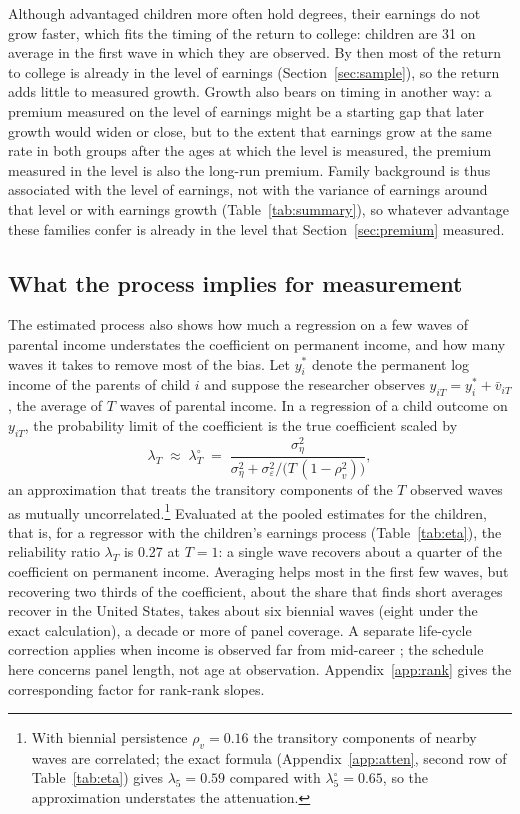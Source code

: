 \documentclass[11pt]{article}
\begin{document}
Although advantaged children more often hold degrees, their earnings do not grow faster, which fits the timing of the return to college: children are 31 on average in the first wave in which they are observed. By then most of the return to college is already in the level of earnings (Section~\ref{sec:sample}), so the return adds little to measured growth. Growth also bears on timing in another way: a premium measured on the level of earnings might be a starting gap that later growth would widen or close, but to the extent that earnings grow at the same rate in both groups after the ages at which the level is measured, the premium measured in the level is also the long-run premium. Family background is thus associated with the level of earnings, not with the variance of earnings around that level or with earnings growth (Table~\ref{tab:summary}), so whatever advantage these families confer is already in the level that Section~\ref{sec:premium} measured.

\subsection{What the process implies for measurement}
\label{sec:measurement}

The estimated process also shows how much a regression on a few waves of parental income understates the coefficient on permanent income, and how many waves it takes to remove most of the bias. Let $y^*_i$ denote the permanent log income of the parents of child $i$
and suppose the researcher
observes $y_{iT} = y^*_i + \bar v_{iT}$, the average of $T$ waves of parental income. In a regression of a child
outcome on $y_{iT}$, the probability limit of the coefficient is the
true coefficient scaled by
\begin{equation}
\lambda_T \;\approx\; \lambda^\circ_T \;=\; \frac{\sigma^2_\eta}
{\sigma^2_\eta + \sigma^2_\varepsilon / \big(T\,(1-\rho_v^2)\big)},
\label{eq:eta}
\end{equation}
an approximation that treats the transitory components of the $T$ observed waves as mutually uncorrelated.\footnote{With biennial persistence $\rho_v = 0.16$ the transitory components of nearby waves are correlated; the exact formula (Appendix~\ref{app:atten}, second row of Table~\ref{tab:eta}) gives $\lambda_5 = 0.59$ compared with $\lambda^\circ_5 = 0.65$, so the approximation understates the attenuation.} Evaluated at the pooled estimates for the children, that is, for a regressor with the children's earnings process (Table~\ref{tab:eta}), the reliability ratio $\lambda_T$ is 0.27 at $T = 1$: a single wave recovers about a quarter of the coefficient on permanent income. Averaging helps most in the first few waves, but recovering two thirds of the coefficient, about the share that \citet{Mazumder2005} finds short averages recover in the United States, takes about six biennial waves (eight under the exact calculation), a decade or more of panel coverage. A separate life-cycle correction applies when income is observed far from mid-career
\citep{HaiderSolon2006}; the schedule here concerns panel length, not age at observation. Appendix~\ref{app:rank} gives the corresponding factor for rank-rank slopes.
\end{document}
